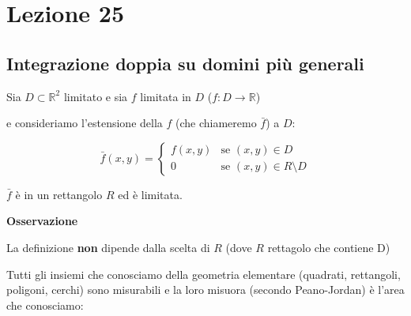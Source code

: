 \documentclass[../appunti-analisi.tex]{subfiles}
\begin{document}
\section{Lezione 25}

\subsection{Integrazione doppia su domini più generali}

Sia $D \subset \mathbb{R}^{2} $ limitato e sia $f$ limitata in $D$ ($f: D \rightarrow \mathbb{R}$)

e consideriamo l'estensione della $f$ (che chiameremo $\bar{f}$) a $D$:

\[
    \bar{f} (x,y) = \begin{cases}
        f(x,y) & \text{se $(x,y) \in D$} \\
        0 & \text{se $(x,y) \in R \setminus D $}
    \end{cases}
\]

$\bar{f} $ è in un rettangolo $R$ ed è limitata.



\textbf{Osservazione} 

La definizione \textbf{non} dipende dalla scelta di $R$ (dove $R$ rettagolo che contiene D)  




Tutti gli insiemi che conosciamo della geometria elementare (quadrati, rettangoli, poligoni, cerchi) sono misurabili e la loro misuora (secondo Peano-Jordan) è l'area che conosciamo:
\end{document}
